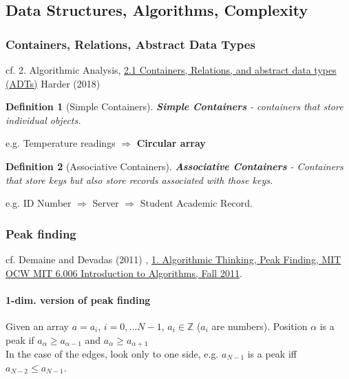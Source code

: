 \documentclass[10pt]{amsart}
\newtheorem{definition}{Definition}
\begin{document}
\begin{multicols*}{2}
\part{Data Structures, Algorithms, Complexity}

\section{Containers, Relations, Abstract Data Types}

cf. 2. Algorithmic Analysis, \href{https://ece.uwaterloo.ca/~dwharder/aads/Lecture_materials/2.01.Containers_relations_ADTs.pptx}{2.1 Containers, Relations, and abstract data types (ADTs)} Harder (2018) \cite{Hard2018}

\begin{definition}[Simple Containers]
	\textbf{Simple Containers} - containers that store individual objects.
\end{definition} 
e.g. Temperature readings $\Longrightarrow$ \textbf{Circular array}

\begin{definition}[Associative Containers]
\textbf{Associative Containers} - Containers that store keys but also store records associated with those keys.
\end{definition} 
e.g. ID Number $\Longrightarrow $ Server $\Longrightarrow$ Student Academic Record.



\section{Peak finding}

cf. Demaine and Devadas (2011) \cite{DeDe2001}, \href{https://youtu.be/HtSuA80QTyo}{1. Algorithmic Thinking, Peak Finding, MIT OCW MIT 6.006 Introduction to Algorithms, Fall 2011}. 

\subsection{1-dim. version of peak finding}

Given an array $a= a_i$, $i=0, \dots N-1$, $a_i \in \mathbb{Z}$ ($a_i$ are numbers). Position $\alpha$ is a peak if $a_{\alpha} \geq a_{\alpha-1}$ and $a_{\alpha} \geq a_{\alpha + 1}$ \\

In the case of the edges, look only to one side, e.g. $a_{N-1}$ is a peak iff $a_{N-2} \leq a_{N-1}$. \\


\end{multicols*}
\end{document}
